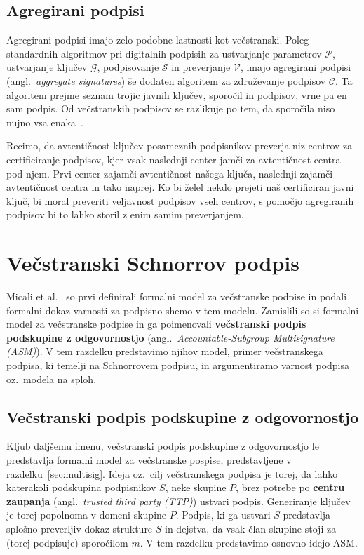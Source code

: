 \documentclass[isrm2, tisk]{fmfdelo}
\begin{document}
\subsection{Agregirani podpisi}
Agregirani podpisi imajo zelo podobne lastnosti kot večstranski. Poleg standardnih algoritmov pri digitalnih
podpisih za ustvarjanje parametrov $\mathcal{P}$, ustvarjanje ključev $\mathcal{G}$, podpisovanje 
$\mathcal{S}$ in preverjanje $\mathcal{V}$, imajo agregirani podpisi (angl.\ \textit{aggregate signatures})
še dodaten algoritem za združevanje podpisov $\mathcal{C}$. Ta algoritem prejme seznam trojic javnih
ključev, sporočil in podpisov, vrne pa en sam podpis. Od večstranskih podpisov se razlikuje po tem,
da sporočila niso nujno vsa enaka~\cite{boneh2011aggregate}.

\begin{primer}
    Recimo, da avtentičnost ključev posameznih podpisnikov preverja niz centrov za certificiranje
    podpisov, kjer vsak naslednji center jamči za avtentičnost centra pod njem. Prvi center zajamči
    avtentičnost našega ključa, naslednji zajamči avtentičnost centra in tako naprej. Ko bi želel
    nekdo prejeti naš certificiran javni ključ, bi moral preveriti veljavnost podpisov vseh centrov,
    s pomočjo agregiranih podpisov bi to lahko storil z enim samim preverjanjem.
\end{primer}

\section{Večstranski Schnorrov podpis}
\label{sec:multischnorr}
Micali et al.~\cite{micali2001asm} so prvi definirali formalni model za večstranske podpise in podali
formalni dokaz varnosti za podpisno shemo v tem modelu. Zamislili so si formalni model za večstranske
podpise in ga poimenovali \textbf{večstranski podpis podskupine z odgovornostjo} (angl.\
\textit{Accountable-Subgroup Multisignature (ASM)}). V tem razdelku predstavimo njihov model, primer
večstranskega podpisa, ki temelji na Schnorrovem podpisu, in argumentiramo varnost podpisa oz.\
modela na sploh.

\subsection{Večstranski podpis podskupine z odgovornostjo}
Kljub daljšemu imenu, večstranski podpis podskupine z odgovornostjo le predstavlja formalni model za
večstranske pospise, predstavljene v razdelku~\ref{sec:multisig}. Ideja oz.\ cilj večstranskega
podpisa je torej, da lahko katerakoli podskupina podpisnikov $S$, neke skupine $P$, brez potrebe po
\textbf{centru zaupanja} (angl.\ \textit{trusted third party (TTP)}) ustvari podpis. Generiranje
ključev je torej popolnoma v domeni skupine $P$. Podpis, ki ga ustvari $S$ predstavlja splošno
preverljiv dokaz strukture $S$ in dejstva, da vsak član skupine stoji za (torej podpisuje) sporočilom
$m$. V tem razdelku predstavimo osnovno idejo ASM.
\end{document}
